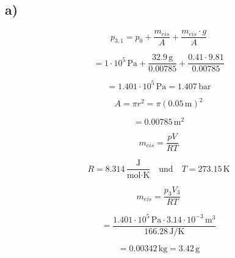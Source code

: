 

\subsection*{a)}

\[
p_{3,1} = p_0 + \frac{m_{eis}}{A} + \frac{m_{eis} \cdot g}{A}
\]

\[
= 1 \cdot 10^5 \, \text{Pa} + \frac{32.9 \, \text{g}}{0.00785} + \frac{0.41 \cdot 9.81}{0.00785}
\]

\[
= 1.401 \cdot 10^5 \, \text{Pa} = 1.407 \, \text{bar}
\]

\[
A = \pi r^2 = \pi (0.05 \, \text{m})^2
\]

\[
= 0.00785 \, \text{m}^2
\]

\[
m_{eis} = \frac{pV}{RT}
\]

\[
R = 8.314 \, \frac{\text{J}}{\text{mol} \cdot \text{K}} \quad \text{und} \quad T = 273.15 \, \text{K}
\]

\[
m_{eis} = \frac{p_3 V_3}{RT}
\]

\[
= \frac{1.401 \cdot 10^5 \, \text{Pa} \cdot 3.14 \cdot 10^{-3} \, \text{m}^3}{166.28 \, \text{J/K}}
\]

\[
= 0.00342 \, \text{kg} = 3.42 \, \text{g}
\]